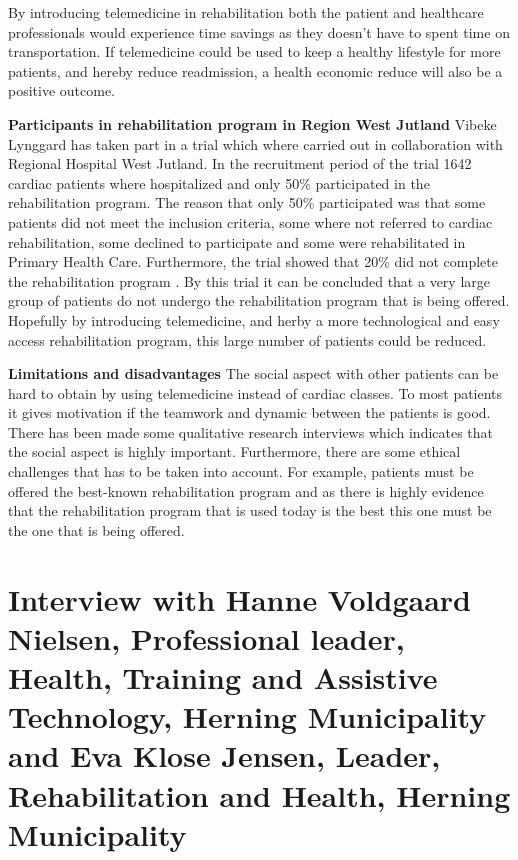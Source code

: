 By introducing telemedicine in rehabilitation both the patient and healthcare professionals would experience time savings as they doesn’t have to spent time on transportation. If telemedicine could be used to keep a healthy lifestyle for more patients, and hereby reduce readmission, a health economic reduce will also be a positive outcome.

\textbf{Participants in rehabilitation program in Region West Jutland} \newline
Vibeke Lynggard has taken part in a trial which where carried out in collaboration with Regional Hospital West Jutland. In the recruitment period of the trial 1642 cardiac patients where hospitalized and only 50\% participated in the rehabilitation program. The reason that only 50\% participated was that some patients did not meet the inclusion criteria, some where not referred to cardiac rehabilitation, some declined to participate and some were rehabilitated in Primary Health Care. Furthermore, the trial showed that 20\% did not complete the rehabilitation program \cite{rehabiliteringDK}. By this trial it can be concluded that a very large group of patients do not undergo the rehabilitation program that is being offered. Hopefully by introducing telemedicine, and herby a more technological and easy access rehabilitation program, this large number of patients could be reduced. 

\textbf{Limitations and disadvantages} \newline
The social aspect with other patients can be hard to obtain by using telemedicine instead of cardiac classes. To most patients it gives motivation if the teamwork and dynamic between the patients is good. There has been made some qualitative research interviews which indicates that the social aspect is highly important. Furthermore, there are some ethical challenges that has to be taken into account. For example, patients must be offered the best-known rehabilitation program and as there is highly evidence that the rehabilitation program that is used today is the best this one must be the one that is being offered.  

\section{Interview with Hanne Voldgaard Nielsen, Professional leader, Health, Training and Assistive Technology, Herning Municipality and Eva Klose Jensen, Leader, Rehabilitation and Health, Herning Municipality}\label{sec: evahanne}

